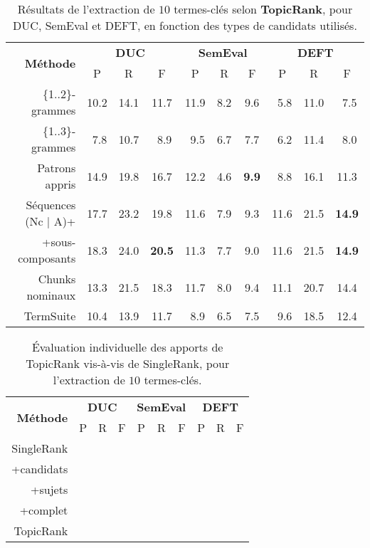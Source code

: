     \begin{table}
      \centering
      \begin{tabular}{@{~~}rc@{~~~}c@{~~~}cc@{~~~}c@{~~~}cc@{~~~}c@{~~~}c@{~~}}
        \toprule
        \multirow{2}{*}[-2pt]{\textbf{Méthode}} & \multicolumn{3}{c}{\textbf{DUC}} & \multicolumn{3}{c}{\textbf{SemEval}} & \multicolumn{3}{c}{\textbf{DEFT}}\\
        \cmidrule(r){2-4}\cmidrule(lr){5-7}\cmidrule(l){8-10}
        & P & R & F & P & R & F & P & R & F\\
        \midrule
        \{1..2\}-grammes & 10.2 & 14.1 & 11.7 & 11.9 & $~~$8.2 & $~~$9.6 & $~~$5.8 & 11.0 & $~~$7.5\\
        \{1..3\}-grammes & $~~$7.8 & 10.7 & $~~$8.9 & $~~$9.5 & $~~$6.7 & $~~$7.7 & $~~$6.2 & 11.4 & $~~$8.0\\
        Patrons appris & 14.9 & 19.8 & 16.7 & 12.2 & $~~$4.6 & \textbf{$~~$9.9} & $~~$8.8 & 16.1 & 11.3\\
        Séquences (Nc | A)+ & 17.7 & 23.2 & 19.8 & 11.6 & $~~$7.9 & $~~$9.3 & 11.6 & 21.5 & \textbf{14.9}\\
        +sous-composants & 18.3 & 24.0 & \textbf{20.5} & 11.3 & $~~$7.7 & $~~$9.0 & 11.6 & 21.5 & \textbf{14.9}\\
        Chunks nominaux& 13.3 & 21.5 & 18.3 & 11.7 & $~~$8.0 & $~~$9.4 & 11.1 & 20.7 & 14.4\\
        TermSuite & 10.4 & 13.9 & 11.7 & $~~$8.9 & $~~$6.5 & $~~$7.5 & $~~$9.6 & 18.5 & 12.4\\
        \bottomrule
      \end{tabular}
      \caption{Résultats de l'extraction de $10$ termes-clés selon
               \textbf{TopicRank}, pour DUC, SemEval et DEFT, en fonction des
               types de candidats utilisés. 
               \label{tab:resultats_de_topicrank}}
    \end{table}

    \begin{table}
      \centering
      \begin{tabular}{@{~~}rc@{~~~}c@{~~~}cc@{~~~}c@{~~~}cc@{~~~}c@{~~~}c@{~~}}
        \toprule
        \multirow{2}{*}[-2pt]{\textbf{Méthode}} & \multicolumn{3}{c}{\textbf{DUC}} & \multicolumn{3}{c}{\textbf{SemEval}} & \multicolumn{3}{c}{\textbf{DEFT}}\\
        \cmidrule(lr){2-4}\cmidrule(lr){5-7}\cmidrule(lr){8-10}
        & P & R & F & P & R & F & P & R & F\\
        \midrule
        SingleRank & & & & & & & & &\\
        +candidats & & & & & & & & &\\
        +sujets & & & & & & & & &\\
        +complet & & & & & & & & &\\
        TopicRank & & &  & & &  & & &\\
        \bottomrule
      \end{tabular}
      \caption{Évaluation individuelle des apports de TopicRank vis-à-vis de
               SingleRank, pour l'extraction de $10$ termes-clés.
               \label{tab:ameliorations_de_singlerank}}
    \end{table}

